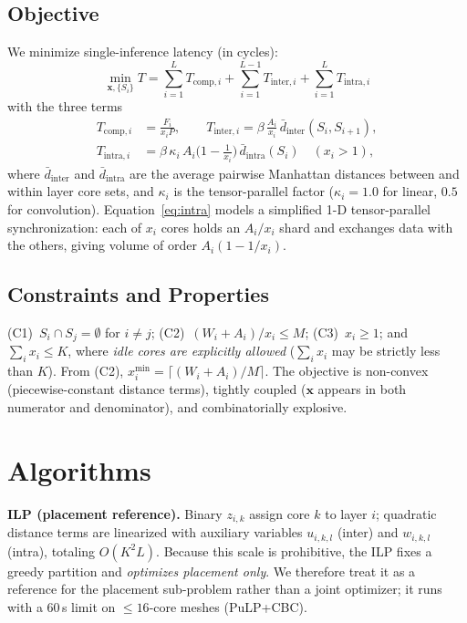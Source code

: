 \documentclass[conference]{IEEEtran}
\begin{document}
\subsection{Objective}
We minimize single-inference latency (in cycles):
\begin{equation}
\min_{\mathbf{x},\{S_i\}} T = \sum_{i=1}^{L} T_{\text{comp},i} + \sum_{i=1}^{L-1} T_{\text{inter},i} + \sum_{i=1}^{L} T_{\text{intra},i}
\label{eq:obj}
\end{equation}
with the three terms
\begin{align}
T_{\text{comp},i} &= \frac{F_i}{x_i P}, \qquad
T_{\text{inter},i} = \beta\,\frac{A_i}{x_i}\,\bar{d}_{\text{inter}}(S_i,S_{i+1}), \\
T_{\text{intra},i} &= \beta\,\kappa_i\,A_i\Big(1-\tfrac{1}{x_i}\Big)\,\bar{d}_{\text{intra}}(S_i)\quad(x_i{>}1),
\label{eq:intra}
\end{align}
where $\bar{d}_{\text{inter}}$ and $\bar{d}_{\text{intra}}$ are the average pairwise Manhattan distances between and within layer core sets, and $\kappa_i$ is the tensor-parallel factor ($\kappa_i{=}1.0$ for linear, $0.5$ for convolution). Equation~\eqref{eq:intra} models a simplified 1-D tensor-parallel synchronization: each of $x_i$ cores holds an $A_i/x_i$ shard and exchanges data with the others, giving volume of order $A_i(1{-}1/x_i)$.

\subsection{Constraints and Properties}
(C1)~$S_i\cap S_j=\emptyset$ for $i{\neq}j$; (C2)~$(W_i{+}A_i)/x_i\le M$; (C3)~$x_i\ge1$; and $\sum_i x_i \le K$, where \emph{idle cores are explicitly allowed} ($\sum_i x_i$ may be strictly less than $K$). From (C2), $x_i^{\min}=\lceil(W_i{+}A_i)/M\rceil$. The objective is non-convex (piecewise-constant distance terms), tightly coupled ($\mathbf{x}$ appears in both numerator and denominator), and combinatorially explosive.

\section{Algorithms}
\textbf{ILP (placement reference).} Binary $z_{i,k}$ assign core $k$ to layer $i$; quadratic distance terms are linearized with auxiliary variables $u_{i,k,l}$ (inter) and $w_{i,k,l}$ (intra), totaling $O(K^2L)$. Because this scale is prohibitive, the ILP fixes a greedy partition and \emph{optimizes placement only}. We therefore treat it as a reference for the placement sub-problem rather than a joint optimizer; it runs with a 60\,s limit on $\le16$-core meshes (PuLP+CBC).
\end{document}
